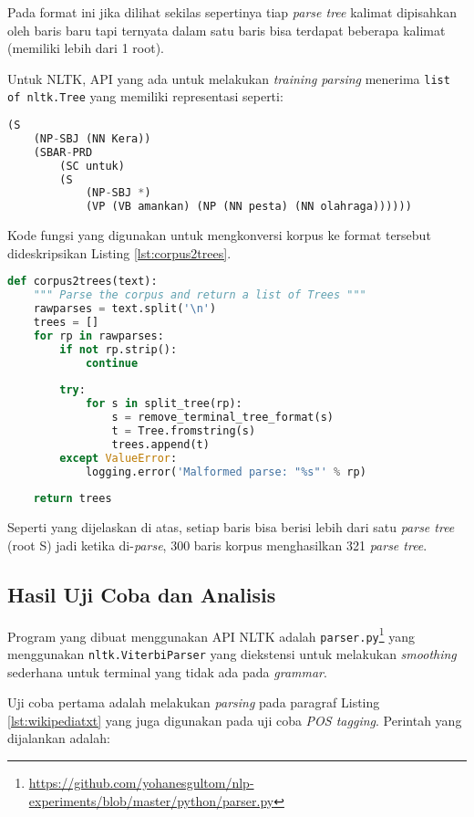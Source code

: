 \documentclass[paper=a4, fontsize=11pt]{scrartcl} %
\numberwithin{equation}{section} %
\numberwithin{figure}{section} %
\numberwithin{table}{section} %
\begin{document}
Pada format ini jika dilihat sekilas sepertinya tiap \textit{parse tree} kalimat dipisahkan oleh baris baru tapi ternyata dalam satu baris bisa terdapat beberapa kalimat (memiliki lebih dari 1 root).

Untuk NLTK, API yang ada untuk melakukan \textit{training} \textit{parsing} menerima \verb|list of nltk.Tree| yang memiliki representasi seperti:

\begin{lstlisting}[language=Python]
(S
	(NP-SBJ (NN Kera))
	(SBAR-PRD
		(SC untuk)
		(S
			(NP-SBJ *)
			(VP (VB amankan) (NP (NN pesta) (NN olahraga))))))
\end{lstlisting}

Kode fungsi yang digunakan untuk mengkonversi korpus ke format tersebut dideskripsikan Listing \ref{lst:corpus2trees}.

\begin{lstlisting}[language=Python, caption={corpus2trees.tag},label={lst:corpus2trees}]
def corpus2trees(text):
	""" Parse the corpus and return a list of Trees """
	rawparses = text.split('\n')
	trees = []
	for rp in rawparses:
		if not rp.strip():
			continue
	
		try:
			for s in split_tree(rp):
				s = remove_terminal_tree_format(s)
				t = Tree.fromstring(s)
				trees.append(t)
		except ValueError:
			logging.error('Malformed parse: "%s"' % rp)
	
	return trees
\end{lstlisting}

Seperti yang dijelaskan di atas, setiap baris bisa berisi lebih dari satu \textit{parse tree} (root S) jadi ketika di-\textit{parse}, 300 baris korpus menghasilkan 321 \textit{parse tree}.

\subsection{Hasil Uji Coba dan Analisis}

Program yang dibuat menggunakan API NLTK adalah \verb|parser.py|\footnote{\url{https://github.com/yohanesgultom/nlp-experiments/blob/master/python/parser.py}} yang menggunakan \verb|nltk.ViterbiParser| yang diekstensi untuk melakukan \textit{smoothing} sederhana untuk terminal yang tidak ada pada \textit{grammar}.

Uji coba pertama adalah melakukan \textit{parsing} pada paragraf Listing \ref{lst:wikipediatxt} yang juga digunakan pada uji coba \textit{POS tagging}. Perintah yang dijalankan adalah:
\end{document}

